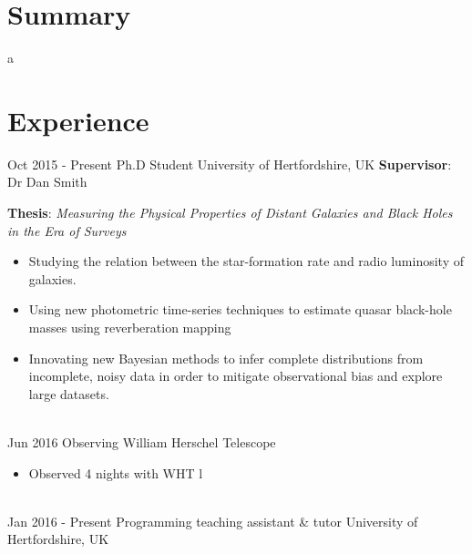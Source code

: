 \documentclass[letterpaper]{twentysecondcv} %
\begin{document}
\makeprofile %
 

\section{Summary}
a

\section{Experience}

\begin{twenty} %
\twentyitem
    	{Oct 2015 -}
		{Present}
        {Ph.D Student}
        {University of Hertfordshire, UK}
        {\textbf{Supervisor}: Dr Dan Smith}
        {
            \textbf{Thesis}: \textit{Measuring the Physical Properties of Distant Galaxies and Black Holes in the Era of Surveys}\vspace{4}
            \begin{itemize}
                \item Studying the relation between the star-formation rate and radio luminosity of galaxies.
                \item Using new photometric time-series techniques to estimate quasar black-hole masses using reverberation mapping
                \item Innovating new Bayesian methods to infer complete distributions from incomplete, noisy data in order to mitigate observational bias and explore large datasets.
            \end{itemize}
        }
        \\
    \twentyitem
        {Jun 2016}
        {}
        {Observing}
        {William Herschel Telescope}
        {}
        {
            \begin{itemize}
                \item Observed 4 nights with WHT l
            \end{itemize}
        }
        \\
    \twentyitem
        {Jan 2016 -}
        {Present}
        {Programming teaching assistant \& tutor}
        {University of Hertfordshire, UK}
        {}
        {
            \begin{itemize}

\end{itemize}}
\end{twenty}
\end{document}
